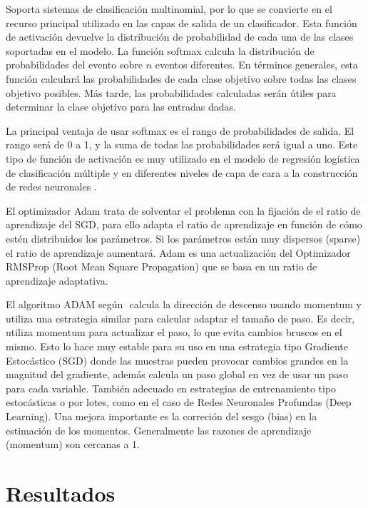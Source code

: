 \documentclass[runningheads]{llncs}
\begin{document}
Soporta sistemas de clasificaci{\'o}n multinomial, por lo que se convierte en el recurso principal utilizado en las capas de salida de un clasificador. Esta funci{\'o}n de activaci{\'o}n devuelve la distribuci{\'o}n de probabilidad de cada una de las clases soportadas en el modelo. La funci{\'o}n softmax calcula la distribuci{\'o}n de probabilidades del evento sobre $n$ eventos diferentes. En t{\'e}rminos generales, esta funci{\'o}n calcular{\'a} las probabilidades de cada clase objetivo sobre todas las clases objetivo posibles. M{\'a}s tarde, las probabilidades calculadas ser{\'a}n {\'u}tiles para determinar la clase objetivo para las entradas dadas.

La principal ventaja de usar softmax es el rango de probabilidades de salida. El rango ser{\'a} de 0 a 1, y la suma de todas las probabilidades ser{\'a} igual a uno. Este tipo de funci{\'o}n de activaci{\'o}n es muy utilizado en el modelo de regresi{\'o}n log{\'i}stica de clasificaci{\'o}n m{\'u}ltiple y en diferentes niveles de capa de cara a la construcci{\'o}n de redes neuronales \cite{ambrogioni2017kernel}⁠.

El optimizador Adam trata de solventar el problema con la fijaci{\'o}n de el ratio de aprendizaje del SGD, para ello adapta el ratio de aprendizaje en funci{\'o}n de c{\'o}mo est{\'e}n distribuidos los par{\'a}metros. Si los par{\'a}metros est{\'a}n muy dispersos (sparse) el ratio de aprendizaje aumentar{\'a}. Adam es una actualizaci{\'o}n del Optimizador RMSProp (Root Mean Square Propagation) que se basa en un ratio de aprendizaje adaptativa.

El algoritmo ADAM seg{\'u}n \cite{kingma2014adam}⁠ calcula la direcci{\'o}n de descenso usando momentum y utiliza una estrategia similar para calcular adaptar el tama\~{n}o de paso. Es decir, utiliza momentum para actualizar el paso, lo que evita cambios bruscos en el mismo. Esto lo hace muy estable para su uso en una estrategia tipo Gradiente Estoc{\'a}stico (SGD) donde las muestras pueden provocar cambios grandes en la magnitud del gradiente, adem{\'a}s calcula un paso global en vez de usar un paso para cada variable. Tambi{\'e}n adecuado en estrategias de entrenamiento tipo estoc{\'a}sticas o por lotes, como en el caso de Redes Neuronales Profundas (Deep Learning). Una mejora importante es la correci{\'o}n del sesgo (bias) en la estimaci{\'o}n de los momentos. Generalmente las razones de aprendizaje (momentum) son cercanas a 1.

\section{Resultados}
\end{document}
